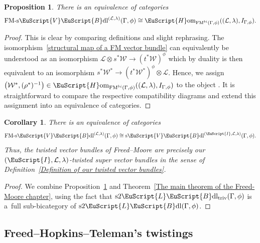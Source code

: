 \documentclass[pdftex]{sigma}
\numberwithin{equation}{section}
\newtheorem{Corollary}[Theorem]{Corollary}
\newtheorem{Proposition}[Theorem]{Proposition}
 { \theoremstyle{definition}
\newtheorem{Definition}[Theorem]{Definition}
\newtheorem{Example}[Theorem]{Example}
\newtheorem{Remark}[Theorem]{Remark} }
\def\mathscr#1{\EuScript{#1}}
\newcommand{\Hom}{\mathscr{H}\mathrm{om}}
\newcommand{\VectBdl}{\mathscr{V}\mathscr{B}\mathrm{dl}}
\newcommand{\LineBdl}{\mathscr{L}\mathscr{B}\mathrm{dl}}
\newcommand{\sVectBdl}{\mathrm{s}\VectBdl}
\newcommand{\stwoLineBdl}{\mathrm{s}2\LineBdl}
\newcommand{\stwoLineBdltriv}{\mathrm{s}2\LineBdl_{\mathrm{triv}}}
\begin{document}
\begin{Proposition} \label{Freed-Moore twisted vector bundles}
 There is an equivalence of categories
 \[
 \mathrm{FM}\text{-}\sVectBdl^{(\mathcal{L},\lambda)}(\Gamma,\phi) \cong \Hom_{\mathrm{FM}^{bi}(\Gamma,\phi)}((\mathcal{L},\lambda),I_{\Gamma,\phi}).
 \]
\end{Proposition}
\begin{proof}
 This is clear by comparing definitions and slight rephrasing.
 The isomorphism~\eqref{structural map of a FM vector bundle} can equivalently be understood
 as an isomorphism
$
 \mathcal{L} \otimes s^{*}\mathcal{W} \to (t^{*}\mathcal{W})^{\phi}
$
 which by duality is then equivalent to an isomorphism
$
 s^{*}\mathcal{W}^* \to (t^{*}\mathcal{W}^*)^{\phi} \otimes \mathcal{L}$.
 Hence, we assign $\bigl(\mathcal{W}^*,(\rho^*)^{-1}\bigr) \in \Hom_{\mathrm{FM}^{bi}(\Gamma,\phi)}((\mathcal{L},\lambda),I_{\Gamma,\phi})$
 to the object \smash{$(\mathcal{W},\rho) \in \mathrm{FM}\text{-}\sVectBdl^{(\mathcal{L},\lambda)}(\Gamma,\phi)$}. It is straightforward to compare the respective compatibility diagrams and
 extend this assignment into an equivalence of categories.
\end{proof}

\begin{Corollary}
\label{twisted-super-vector-bundles-FM}
There is an equivalence of categories
\begin{equation*}
\mathrm{FM}\text{-}\sVectBdl^{(\mathcal{L},\lambda)}(\Gamma,\phi) \cong \sVectBdl^{(\mathscr{I},\mathcal{L},\lambda)}(\Gamma,\phi) .
\end{equation*}
Thus, the twisted vector bundles of Freed--Moore are precisely our $(\mathscr{I},\mathcal{L},\lambda)$-twisted super vector bundles in the sense of Definition~{\rm\ref{Definition of our twisted vector bundles}}.
\end{Corollary}

\begin{proof}
We combine Proposition~\ref{Freed-Moore twisted vector bundles} and Theorem~\ref{The main theorem of the Freed-Moore chapter}, using the fact that $\stwoLineBdltriv(\Gamma,\phi)$ is a~full sub-bicategory of $\stwoLineBdl(\Gamma,\phi)$.
\end{proof}

\subsection{Freed--Hopkins--Teleman's twistings}
\label{Freed--Hopkins--Teleman-twistings}
\end{document}
